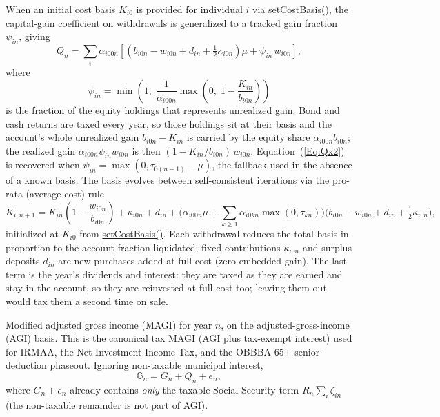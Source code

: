 \documentclass[fleqn,12pt]{report}
\newcommand{\code}[1]{\url{#1}}
\begin{document}
\begin{description}[leftmargin=4em,style=multiline]
	When an initial cost basis $K_{i0}$ is provided for individual $i$ via
	\code{setCostBasis()}, the capital-gain coefficient on withdrawals is
	generalized to a tracked gain fraction $\psi_{in}$, giving
	\begin{equation}
		\label{Eq:Qx3}
		Q_n = \sum_i \alpha_{i00n}\!\left[(b_{i0n} - w_{i0n} + d_{in} + \tfrac{1}{2}\kappa_{i0n})\mu
		      + \psi_{in}\,w_{i0n}\right],
	\end{equation}
	where
	\begin{equation}
		\label{Eq:GainFrac}
		\psi_{in} = \min\!\left(1,\;\frac{1}{\alpha_{i00n}}\max\!\left(0,\;1 - \frac{K_{in}}{b_{i0n}}\right)\right)
	\end{equation}
	is the fraction of the equity holdings that represents unrealized gain.
	Bond and cash returns are taxed every year, so those holdings sit at their basis and
	the account's whole unrealized gain $b_{i0n} - K_{in}$ is carried by the equity share
	$\alpha_{i00n} b_{i0n}$; the realized gain $\alpha_{i00n}\psi_{in} w_{i0n}$ is then
	$(1 - K_{in}/b_{i0n})\,w_{i0n}$.
	Equation~(\ref{Eq:Qx2}) is recovered when $\psi_{in} = \max(0,\tau_{0(n-1)}-\mu)$,
	the fallback used in the absence of a known basis.
	The basis evolves between self-consistent iterations via the pro-rata (average-cost) rule
	\begin{equation}
		\label{Eq:BasisUpdate}
		K_{i,n+1} = K_{in}\!\left(1 - \frac{w_{i0n}}{b_{i0n}}\right) + \kappa_{i0n} + d_{in}
		+ \Big(\alpha_{i00n}\mu + \sum_{k\ge1}\alpha_{i0kn}\max(0, \tau_{kn})\Big)
		  \big(b_{i0n} - w_{i0n} + d_{in} + \tfrac{1}{2}\kappa_{i0n}\big),
	\end{equation}
	initialized at $K_{i0}$ from \code{setCostBasis()}.
	Each withdrawal reduces the total basis in proportion to the account fraction
	liquidated; fixed contributions $\kappa_{i0n}$ and surplus deposits $d_{in}$ are
	new purchases added at full cost (zero embedded gain).
	The last term is the year's dividends and interest: they are taxed as they are earned
	and stay in the account, so they are reinvested at full cost too; leaving them out
	would tax them a second time on sale.

\item [$\mathbb{G}_n$]
	Modified adjusted gross income (MAGI) for year $n$, on the adjusted-gross-income
	(AGI) basis. This is the canonical tax MAGI (AGI plus tax-exempt interest) used
	for IRMAA, the Net Investment Income Tax, and the OBBBA 65+ senior-deduction
	phaseout. Ignoring non-taxable municipal interest,
	\begin{equation}
		\mathbb{G}_n = G_n + Q_n + e_n,
	\end{equation}
	where $G_n + e_n$ already contains \emph{only} the taxable Social Security term
	$R_n\sum_i\bar{\zeta}_{in}$ (the non-taxable remainder is not part of AGI).


\end{description}
\end{document}
